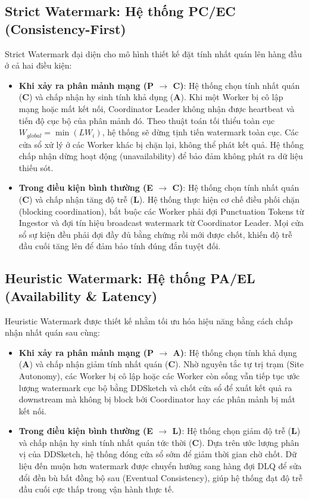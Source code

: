 \documentclass[12pt,a4paper]{article}
\begin{document}
\subsection{Strict Watermark: Hệ thống PC/EC (Consistency-First)}
Strict Watermark đại diện cho mô hình thiết kế đặt tính nhất quán lên hàng đầu ở cả hai điều kiện:
\begin{itemize}
    \item \textbf{Khi xảy ra phân mảnh mạng (P $\rightarrow$ C)}: Hệ thống chọn tính nhất quán (\textbf{C}) và chấp nhận hy sinh tính khả dụng (\textbf{A}). Khi một Worker bị cô lập mạng hoặc mất kết nối, Coordinator Leader không nhận được heartbeat và tiến độ cục bộ của phân mảnh đó. Theo thuật toán tối thiểu toàn cục $W_{global} = \min(LW_i)$, hệ thống sẽ dừng tịnh tiến watermark toàn cục. Các cửa sổ xử lý ở các Worker khác bị chặn lại, không thể phát kết quả. Hệ thống chấp nhận dừng hoạt động (unavailability) để bảo đảm không phát ra dữ liệu thiếu sót.
    \item \textbf{Trong điều kiện bình thường (E $\rightarrow$ C)}: Hệ thống chọn tính nhất quán (\textbf{C}) và chấp nhận tăng độ trễ (\textbf{L}). Hệ thống thực hiện cơ chế điều phối chặn (blocking coordination), bắt buộc các Worker phải đợi Punctuation Tokens từ Ingestor và đợi tín hiệu broadcast watermark từ Coordinator Leader. Mọi cửa sổ sự kiện đều phải đợi đầy đủ bằng chứng rồi mới được chốt, khiến độ trễ đầu cuối tăng lên để đảm bảo tính đúng đắn tuyệt đối.
\end{itemize}

\subsection{Heuristic Watermark: Hệ thống PA/EL (Availability \& Latency)}
Heuristic Watermark được thiết kế nhằm tối ưu hóa hiệu năng bằng cách chấp nhận nhất quán sau cùng:
\begin{itemize}
    \item \textbf{Khi xảy ra phân mảnh mạng (P $\rightarrow$ A)}: Hệ thống chọn tính khả dụng (\textbf{A}) và chấp nhận giảm tính nhất quán (\textbf{C}). Nhờ nguyên tắc tự trị trạm (Site Autonomy), các Worker bị cô lập hoặc các Worker còn sống vẫn tiếp tục ước lượng watermark cục bộ bằng DDSketch và chốt cửa sổ để xuất kết quả ra downstream mà không bị block bởi Coordinator hay các phân mảnh bị mất kết nối.
    \item \textbf{Trong điều kiện bình thường (E $\rightarrow$ L)}: Hệ thống chọn giảm độ trễ (\textbf{L}) và chấp nhận hy sinh tính nhất quán tức thời (\textbf{C}). Dựa trên ước lượng phân vị của DDSketch, hệ thống đóng cửa sổ sớm để giảm thời gian chờ chốt. Dữ liệu đến muộn hơn watermark được chuyển hướng sang hàng đợi DLQ để sửa đổi đền bù bất đồng bộ sau (Eventual Consistency), giúp hệ thống đạt độ trễ đầu cuối cực thấp trong vận hành thực tế.
\end{itemize}
\end{document}
